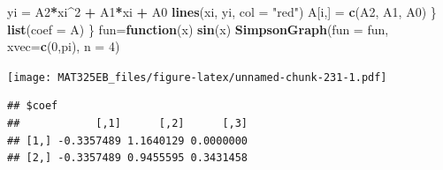 \documentclass[
]{book}
\newenvironment{Shaded}{\begin{snugshade}}{\end{snugshade}}
\newcommand{\AttributeTok}[1]{\textcolor[rgb]{0.13,0.29,0.53}{#1}}
\newcommand{\ControlFlowTok}[1]{\textcolor[rgb]{0.13,0.29,0.53}{\textbf{#1}}}
\newcommand{\DecValTok}[1]{\textcolor[rgb]{0.00,0.00,0.81}{#1}}
\newcommand{\FunctionTok}[1]{\textcolor[rgb]{0.13,0.29,0.53}{\textbf{#1}}}
\newcommand{\NormalTok}[1]{#1}
\newcommand{\OtherTok}[1]{\textcolor[rgb]{0.56,0.35,0.01}{#1}}
\newcommand{\SpecialCharTok}[1]{\textcolor[rgb]{0.81,0.36,0.00}{\textbf{#1}}}
\newcommand{\StringTok}[1]{\textcolor[rgb]{0.31,0.60,0.02}{#1}}
\begin{document}
\begin{Shaded}
\begin{Highlighting}[]
\NormalTok{    yi }\OtherTok{=}\NormalTok{ A2}\SpecialCharTok{*}\NormalTok{xi}\SpecialCharTok{\^{}}\DecValTok{2} \SpecialCharTok{+}\NormalTok{ A1}\SpecialCharTok{*}\NormalTok{xi }\SpecialCharTok{+}\NormalTok{ A0}
    \FunctionTok{lines}\NormalTok{(xi, yi, }\AttributeTok{col =} \StringTok{"red"}\NormalTok{)}
\NormalTok{    A[i,] }\OtherTok{=} \FunctionTok{c}\NormalTok{(A2, A1, A0)}
\NormalTok{  \}}
  \FunctionTok{list}\NormalTok{(}\AttributeTok{coef =}\NormalTok{ A)}
\NormalTok{\}}
\NormalTok{fun}\OtherTok{=}\ControlFlowTok{function}\NormalTok{(x) }\FunctionTok{sin}\NormalTok{(x)}
\FunctionTok{SimpsonGraph}\NormalTok{(}\AttributeTok{fun =}\NormalTok{ fun, }\AttributeTok{xvec=}\FunctionTok{c}\NormalTok{(}\DecValTok{0}\NormalTok{,pi), }\AttributeTok{n =} \DecValTok{4}\NormalTok{)}
\end{Highlighting}
\end{Shaded}

\texttt{[image: MAT325EB\_files/figure-latex/unnamed-chunk-231-1.pdf]}

\begin{verbatim}
## $coef
##            [,1]      [,2]      [,3]
## [1,] -0.3357489 1.1640129 0.0000000
## [2,] -0.3357489 0.9455595 0.3431458
\end{verbatim}
\end{document}
